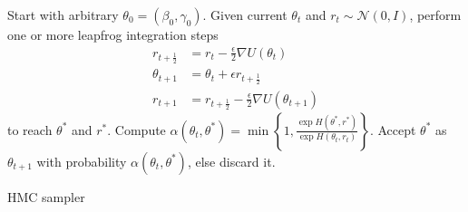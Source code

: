 \begin{algorithm}[!ht]
\begin{algorithmic}
\State Start with arbitrary $\theta_0 = (\beta _0, \gamma _0)$.
  \State Given current $\theta_t$ and $r_t \sim \mathcal{N}(0, I)$, perform one or more leapfrog integration
  steps 
  \begin{align*}
  r_{t + \frac{1}{2}} &= r_t - \frac{\epsilon}{2}\nabla U(\theta_t) \\
   \theta_{t+ 1} &= \theta_t + \epsilon  r_{t + \frac{1}{2}} \\
   r_{t + 1} &= r_{t + \frac{1}{2}} - \frac{\epsilon}{2}\nabla U(\theta_{t+ 1})
    \end{align*}
    to reach  $\theta^*$ and $r^*$.
    \State Compute $\alpha(\theta_t, \theta^*) = \min \left\{ 1, \frac{\exp H(\theta^*, r^*)}{\exp H(\theta_t, r_t)} \right\} $.
   \State Accept $\theta^*$ as $\theta_{t+1}$ with probability $\alpha(\theta_t, \theta^*)$, else discard it. 
  
 \EndWhile
 \end{algorithmic}
 \caption{HMC sampler}\label{alg:hmc}
\end{algorithm}



